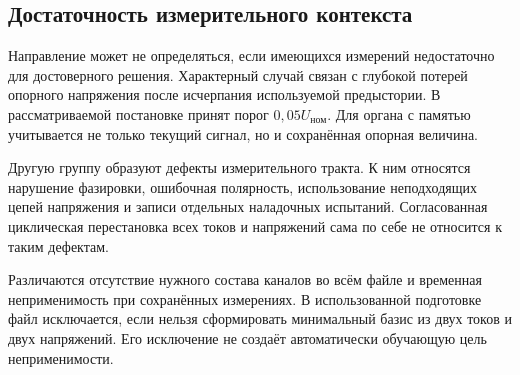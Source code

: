 {}

\subsection{Достаточность измерительного контекста}
\label{sec:ch5_applicability_target}

Направление может не определяться,
если имеющихся измерений недостаточно
для достоверного решения.
Характерный случай связан с глубокой потерей
опорного напряжения после исчерпания
используемой предыстории.
В рассматриваемой постановке принят порог
$0{,}05U_{\text{ном}}$.
Для органа с памятью учитывается
не только текущий сигнал,
но и сохранённая опорная величина.

Другую группу образуют дефекты измерительного
тракта. К ним относятся нарушение фазировки,
ошибочная полярность, использование неподходящих
цепей напряжения и записи отдельных
наладочных испытаний.
Согласованная циклическая перестановка
всех токов и напряжений сама по себе
не относится к таким дефектам.

{}

Различаются отсутствие нужного состава
каналов во всём файле и временная
неприменимость при сохранённых измерениях.
В использованной подготовке файл исключается,
если нельзя сформировать минимальный
базис из двух токов и двух напряжений.
Его исключение не создаёт автоматически
обучающую цель неприменимости.

